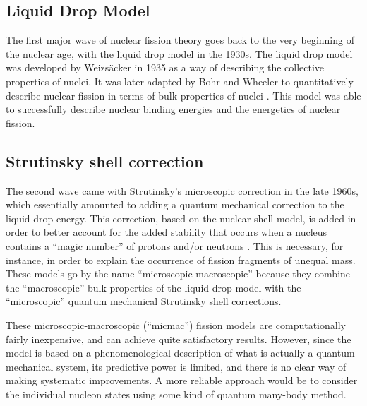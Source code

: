 \subsection{Liquid Drop Model}
The first major wave of nuclear fission theory goes back to the very beginning of the nuclear age, with the liquid drop model in the 1930s. The liquid drop model was developed by Weizs\"acker in 1935 \cite{Weizsacker1935} as a way of describing the collective properties of nuclei. It was later adapted by Bohr and Wheeler to quantitatively describe nuclear fission in terms of bulk properties of nuclei \cite{Bohr1939}. This model was able to successfully describe nuclear binding energies and the energetics of nuclear fission.

\subsection{Strutinsky shell correction}
The second wave came with Strutinsky’s microscopic correction in the late 1960s, which essentially amounted to adding a quantum mechanical correction to the liquid drop energy. This correction, based on the nuclear shell model, is added in order to better account for the added stability that occurs when a nucleus contains a ``magic number'' of protons and/or neutrons \cite{Strutinsky1967, Strutinsky1968, Brack1972}. This is necessary, for instance, in order to explain the occurrence of fission fragments of unequal mass. These models go by the name ``microscopic-macroscopic'' because they combine the ``macroscopic'' bulk properties of the liquid-drop model with the ``microscopic'' quantum mechanical Strutinsky shell corrections.

These microscopic-macroscopic (``micmac'') fission models are computationally fairly inexpensive, and can achieve quite satisfactory results. However, since the model is based on a phenomenological description of what is actually a quantum mechanical system, its predictive power is limited, and there is no clear way of making systematic improvements. A more reliable approach would be to consider the individual nucleon states using some kind of quantum many-body method. 

